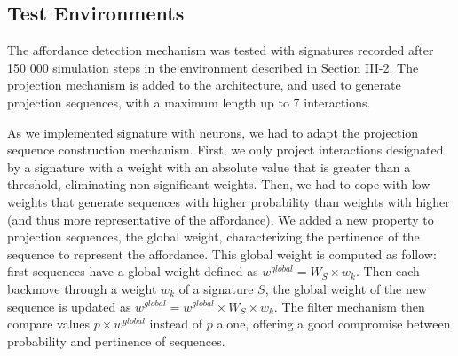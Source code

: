 \documentclass[conference]{IEEEtran}
\begin{document}


\subsection{Test Environments}

The affordance detection mechanism was tested with signatures recorded after 150 000 simulation steps in the environment described in Section III-2. The projection mechanism is added to the architecture, and used to generate projection sequences, with a maximum length up to 7 interactions.

As we implemented signature with neurons, we had to adapt the projection sequence construction mechanism. First, we only project interactions designated by a signature with a weight with an absolute value that is greater than a threshold, eliminating non-significant weights. Then, we had to cope with low weights that generate sequences with higher probability than weights with higher (and thus more representative of the affordance). We added a new property to projection sequences, the global weight, characterizing the pertinence of the sequence to represent the affordance. This global weight is computed as follow: first sequences have a global weight defined as $w^{global} = W_S \times w_k$. Then each backmove through a weight $w_k$ of a signature $S$, the global weight of the new sequence is updated as $w^{global}=w^{global} \times  W_S \times w_k$. The filter mechanism then compare values $p \times w^{global}$ instead of $p$ alone, offering a good compromise between probability and pertinence of sequences.




\end{document}
